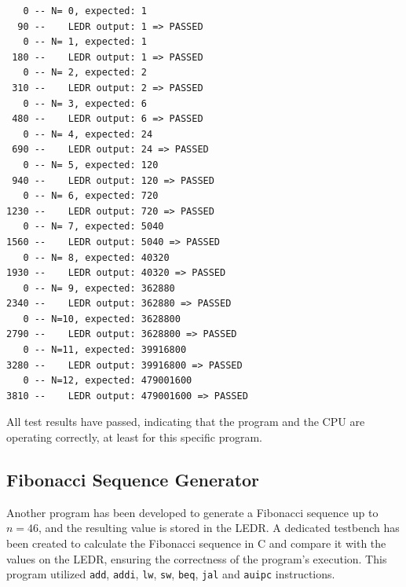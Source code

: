 \documentclass[12pt,a4paper,oneside]{book} %
\begin{document}
\begin{verbatim}
   0 -- N= 0, expected: 1
  90 --    LEDR output: 1 => PASSED
   0 -- N= 1, expected: 1
 180 --    LEDR output: 1 => PASSED
   0 -- N= 2, expected: 2
 310 --    LEDR output: 2 => PASSED
   0 -- N= 3, expected: 6
 480 --    LEDR output: 6 => PASSED
   0 -- N= 4, expected: 24
 690 --    LEDR output: 24 => PASSED
   0 -- N= 5, expected: 120
 940 --    LEDR output: 120 => PASSED
   0 -- N= 6, expected: 720
1230 --    LEDR output: 720 => PASSED
   0 -- N= 7, expected: 5040
1560 --    LEDR output: 5040 => PASSED
   0 -- N= 8, expected: 40320
1930 --    LEDR output: 40320 => PASSED
   0 -- N= 9, expected: 362880
2340 --    LEDR output: 362880 => PASSED
   0 -- N=10, expected: 3628800
2790 --    LEDR output: 3628800 => PASSED
   0 -- N=11, expected: 39916800
3280 --    LEDR output: 39916800 => PASSED
   0 -- N=12, expected: 479001600
3810 --    LEDR output: 479001600 => PASSED
\end{verbatim}

All test results have passed, indicating that the program and the CPU are operating correctly, at least for this specific program.

\subsection{Fibonacci Sequence Generator}
Another program has been developed to generate a Fibonacci sequence up to $n = 46$, and the resulting value is stored in the LEDR. A dedicated testbench has been created to calculate the Fibonacci sequence in C and compare it with the values on the LEDR, ensuring the correctness of the program's execution. This program utilized \texttt{add}, \texttt{addi}, \texttt{lw}, \texttt{sw}, \texttt{beq}, \texttt{jal} and \texttt{auipc} instructions.
\end{document}
